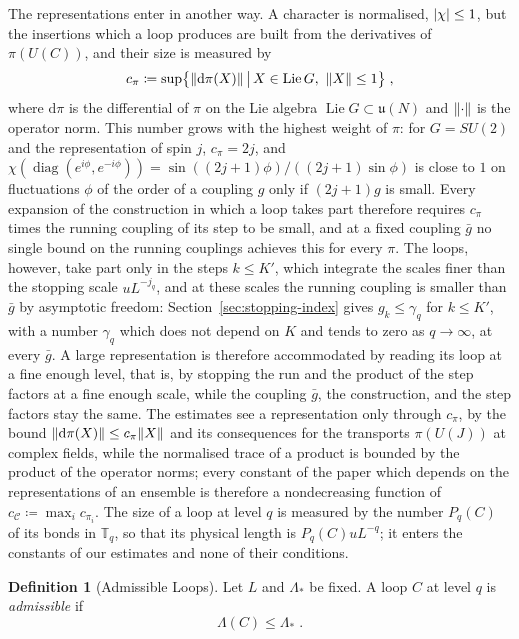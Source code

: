 \documentclass[11pt]{preprint}
\newcommand{\dd}{\mathrm{d}}
\DeclarePairedDelimiter{\abs}{\lvert}{\rvert}
\DeclarePairedDelimiter{\norm}{\lVert}{\rVert}
\numberwithin{equation}{section}
\theoremstyle{definition}
\newtheorem{definition}[theorem]{Definition}
\theoremstyle{remark}
\theoremstyle{plain}
\begin{document}
The representations enter in another way. A character is normalised, $\abs{\chi} \leq 1$, but the insertions which a loop produces are built from the derivatives of $\pi(U(C))$, and their size is measured by
\begin{equation}\label{eq:representation-constant}
    c_\pi \coloneqq \sup\bigl\{ \norm{\dd\pi(X)} \,\big|\, X \in \operatorname{Lie}G,\ \norm{X} \leq 1 \bigr\}\;,
\end{equation}
where $\dd\pi$ is the differential of $\pi$ on the Lie algebra $\operatorname{Lie}G \subset \mathfrak u(N)$ and $\norm{\cdot}$ is the operator norm. This number grows with the highest weight of $\pi$: for $G = SU(2)$ and the representation of spin $j$, $c_\pi = 2j$, and $\chi(\operatorname{diag}(e^{i\phi}, e^{-i\phi})) = \sin((2j + 1)\phi)/((2j + 1)\sin\phi)$ is close to $1$ on fluctuations $\phi$ of the order of a coupling $g$ only if $(2j + 1)g$ is small. Every expansion of the construction in which a loop takes part therefore requires $c_\pi$ times the running coupling of its step to be small, and at a fixed coupling $\bar g$ no single bound on the running couplings achieves this for every $\pi$. The loops, however, take part only in the steps $k \leq K'$, which integrate the scales finer than the stopping scale $uL^{-j_q}$, and at these scales the running coupling is smaller than $\bar g$ by asymptotic freedom: Section~\ref{sec:stopping-index} gives $g_k \leq \gamma_q$ for $k \leq K'$, with a number $\gamma_q$ which does not depend on $K$ and tends to zero as $q \to \infty$, at every $\bar g$. A large representation is therefore accommodated by reading its loop at a fine enough level, that is, by stopping the run and the product of the step factors at a fine enough scale, while the coupling $\bar g$, the construction, and the step factors stay the same. The estimates see a representation only through $c_\pi$, by the bound $\norm{\dd\pi(X)} \leq c_\pi\norm{X}$ and its consequences for the transports $\pi(U(J))$ at complex fields, while the normalised trace of a product is bounded by the product of the operator norms; every constant of the paper which depends on the representations of an ensemble is therefore a nondecreasing function of $c_{\mathcal C} \coloneqq \max_ic_{\pi_i}$. The size of a loop at level $q$ is measured by the number $P_q(C)$ of its bonds in $\mathbb T_q$, so that its physical length is $P_q(C)uL^{-q}$; it enters the constants of our estimates and none of their conditions.

\begin{definition}[Admissible Loops]\label{def:admissible}
Let $L$ and $\Lambda_*$ be fixed. A loop $C$ at level $q$ is \emph{admissible} if
\begin{equation}\label{eq:admissible}
    \Lambda(C) \leq \Lambda_*\;.
\end{equation}
\end{definition}
\end{document}
